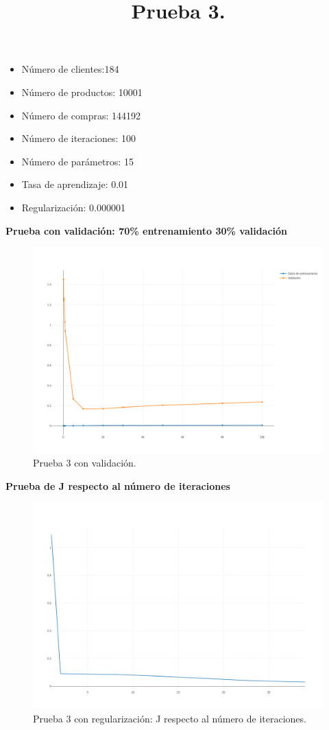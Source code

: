 {{{{{%
\title{\textbf{Prueba 3.}}

\begin{itemize}
\item Número de clientes:184
\item Número de productos: 10001
\item Número de compras: 144192
\item Número de iteraciones: 100
\item Número de parámetros: 15
\item Tasa de aprendizaje: 0.01
\item Regularización: 0.000001
\end{itemize}
\newpage
\textbf{Prueba con validación: 70\% entrenamiento 30\% validación}

\FloatBarrier
\begin{figure}[htbp!]
		\centering
			\includegraphics[width=1 \textwidth]{imagenes/pruebassistemarecom/100_000001_15}
		\caption{Prueba 3 con validación.}
		\label{gradiente_desc}
\end{figure}
\FloatBarrier
\newpage
\textbf{Prueba de J respecto al número de iteraciones}

\FloatBarrier
\begin{figure}[htbp!]
		\centering
			\includegraphics[width=1 \textwidth]{imagenes/pruebassistemarecom/2_3}
		\caption{Prueba 3 con regularización: J respecto al número de iteraciones.}
		\label{gradiente_desc}
\end{figure}
\FloatBarrier

}}}}}
